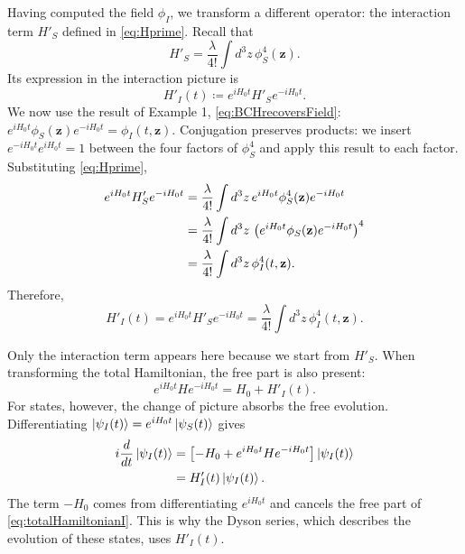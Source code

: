 \documentclass[11pt,letterpaper]{article}
\theoremstyle{definition}
\theoremstyle{definition}
\newcommand{\eqbox}[1]{\boxed{\displaystyle #1}}
\begin{document}
Having computed the field $\phi_I$, we transform a different operator:
the interaction term $H'_S$ defined in \eqref{eq:Hprime}. Recall that
\begin{equation}
  H'_S=\frac{\lambda}{4!}\int d^3z\,\phi_S^4(\mathbf{z}).
\end{equation}
Its expression in the interaction picture is
\begin{equation}
  \eqbox{H'_I(t)\coloneqq e^{iH_0t}H'_Se^{-iH_0t}.}
  \label{eq:HIdefinition}
\end{equation}
We now use the result of Example 1, \eqref{eq:BCHrecoversField}:
$e^{iH_0t}\phi_S(\mathbf{z})e^{-iH_0t}=\phi_I(t,\mathbf{z})$.
Conjugation preserves products: we insert $e^{-iH_0t}e^{iH_0t}=1$
between the four factors of $\phi_S^4$ and apply this result to each
factor. Substituting \eqref{eq:Hprime},
\begin{align}
  e^{iH_0t}H'_Se^{-iH_0t}
  &=\frac{\lambda}{4!}\int d^3z\,
    e^{iH_0t}\phi_S^4(\mathbf{z})e^{-iH_0t}
    \notag\\
  &=\frac{\lambda}{4!}\int d^3z\,
    \left(e^{iH_0t}\phi_S(\mathbf{z})e^{-iH_0t}\right)^4
    \notag\\
  &=\frac{\lambda}{4!}\int d^3z\,\phi_I^4(t,\mathbf{z}).
  \label{eq:HSaHI}
\end{align}
Therefore,
\begin{equation}
  \eqbox{H'_I(t)
  =e^{iH_0t}H'_Se^{-iH_0t}
  =\frac{\lambda}{4!}\int d^3z\,\phi_I^4(t,\mathbf{z}).}
  \label{eq:HIphi4}
\end{equation}

Only the interaction term appears here because we start from $H'_S$.
When transforming the total Hamiltonian, the free part is also present:
\begin{equation}
  e^{iH_0t}He^{-iH_0t}=H_0+H'_I(t).
  \label{eq:totalHamiltonianI}
\end{equation}
For states, however, the change of picture absorbs the free evolution.
Differentiating\newline
$\ket{\psi_I(t)}=e^{iH_0t}\ket{\psi_S(t)}$\allowbreak{} gives
\begin{align}
  i\frac{d}{dt}\ket{\psi_I(t)}
  &=\left[-H_0+e^{iH_0t}He^{-iH_0t}\right]\ket{\psi_I(t)}
  \notag\\
  &=H'_I(t)\ket{\psi_I(t)}.
  \label{eq:interactionGenerator}
\end{align}
The term $-H_0$ comes from differentiating $e^{iH_0t}$ and cancels
the free part of \eqref{eq:totalHamiltonianI}. This is why the Dyson
series, which describes the evolution of these states, uses $H'_I(t)$.
\end{document}
